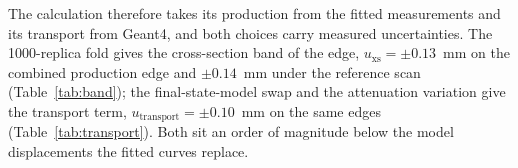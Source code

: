 \documentclass[11pt]{article}
\begin{document}
The calculation therefore takes its production from the fitted measurements
and its transport from Geant4, and both choices carry measured
uncertainties.  The 1000-replica fold gives the cross-section band of the
edge, $u_{\mathrm{xs}} = \pm0.13$~mm on the combined production edge and
$\pm0.14$~mm under the reference scan (Table~\ref{tab:band}); the
final-state-model swap and the attenuation variation give the transport
term, $u_{\mathrm{transport}} = \pm0.10$~mm on the same edges
(Table~\ref{tab:transport}).  Both sit an order of magnitude below the
model displacements the fitted curves replace.
\end{document}
